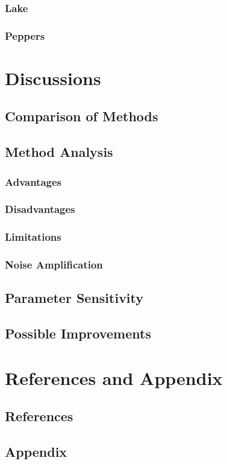 \documentclass[12pt,a4paper]{article}
\begin{document}
\subsubsection{Lake}
\subsubsection{Peppers}

\section{Discussions} %
\subsection{Comparison of Methods} %
\subsection{Method Analysis} %
\subsubsection{Advantages} %
\subsubsection{Disadvantages} %
\subsubsection{Limitations} %
\subsubsection{Noise Amplification} %
\subsection{Parameter Sensitivity} %
\subsection{Possible Improvements} %

\section{References and Appendix} %
\subsection{References}
\subsection{Appendix}
\end{document}
